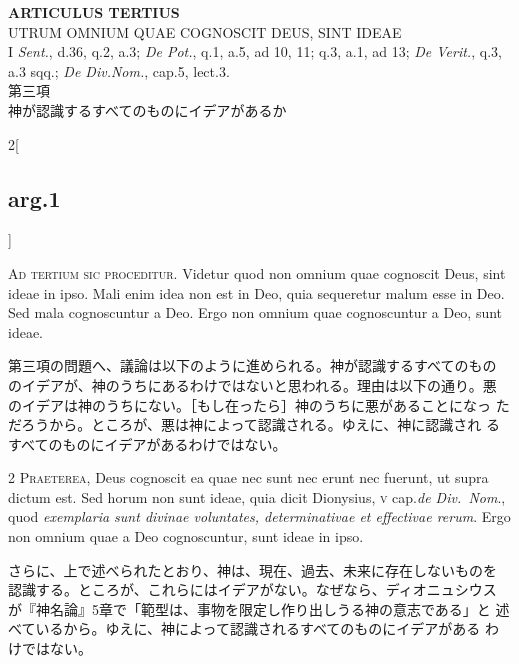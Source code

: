 \documentclass[paper=a4paper,fontsize=10pt,jafontsize=9pt,titlepage]{jlreq}
\begin{document}
\begin{center}
 {\Large {\bfseries ARTICULUS TERTIUS}}\\
 {\large UTRUM OMNIUM QUAE COGNOSCIT DEUS, SINT IDEAE}\\
 {\footnotesize I {\itshape Sent.}, d.36, q.2, a.3; {\itshape De
 Pot.}, q.1, a.5, ad 10, 11; q.3, a.1, ad 13; {\itshape De Verit.},
 q.3, a.3 sqq.; {\itshape De Div.Nom.}, cap.5, lect.3.}\\
 {\Large 第三項\\神が認識するすべてのものにイデアがあるか}
\end{center}

{}
\setcounter{section}{3}
\setcounter{subsection}{0}

\begin{paracol}{2}[\subsection{arg.1}]

{\huge A}{\scshape d tertium sic proceditur}. Videtur quod non
omnium quae cognoscit Deus, sint ideae in ipso. Mali enim idea non est
in Deo, quia sequeretur malum esse in Deo. Sed mala cognoscuntur a
Deo. Ergo non omnium quae cognoscuntur a Deo, sunt ideae.

\switchcolumn

第三項の問題へ、議論は以下のように進められる。神が認識するすべてのもの
のイデアが、神のうちにあるわけではないと思われる。理由は以下の通り。悪
のイデアは神のうちにない。［もし在ったら］神のうちに悪があることになっ
ただろうから。ところが、悪は神によって認識される。ゆえに、神に認識され
るすべてのものにイデアがあるわけではない。


{\scshape 2 Praeterea}, Deus cognoscit ea quae nec sunt nec erunt nec
fuerunt, ut supra dictum est. Sed horum non sunt ideae, quia dicit
Dionysius, {\scshape v} cap.{\itshape de Div.~Nom}., quod {\itshape
exemplaria sunt divinae voluntates, determinativae et effectivae
rerum}. Ergo non omnium quae a Deo cognoscuntur, sunt ideae in ipso.

\switchcolumn

さらに、上で述べられたとおり、神は、現在、過去、未来に存在しないものを
認識する。ところが、これらにはイデアがない。なぜなら、ディオニュシウス
が『神名論』5章で「範型は、事物を限定し作り出しうる神の意志である」と
述べているから。ゆえに、神によって認識されるすべてのものにイデアがある
わけではない。


\end{paracol}
\end{document}
